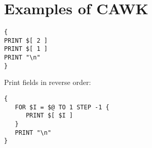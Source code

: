 \section*{Examples of CAWK}
\begin{verbatim}
{
PRINT $[ 2 ]
PRINT $[ 1 ]
PRINT "\n"
}
\end{verbatim}

\noindent Print fields in reverse order:
\begin{verbatim}
{
   FOR $I = $@ TO 1 STEP -1 {
      PRINT $[ $I ]
   }
   PRINT "\n"
}
\end{verbatim}
